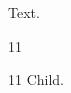 \documentclass[paper=A4]{ropas-poster}
\begin{document}
Text.\begin{postergrid}{1}{1}
\begin{posterblock}{1}{1}
Child.
\end{posterblock}
\end{postergrid}
\end{document}
